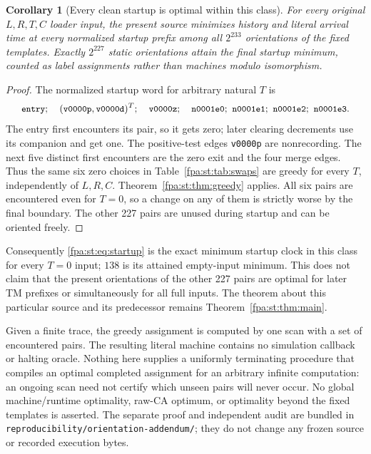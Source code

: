 \documentclass[11pt,a4paper]{article}
\numberwithin{equation}{section}
\newtheorem{corollary}[theorem]{Corollary}
\newcommand{\code}[1]{\texttt{\small #1}}
\begin{document}
\begin{corollary}[Every clean startup is optimal within this class]
\label{fpa:st:cor:optimalstartup}
For every original $L,R,T,C$ loader input, the present source minimizes
history and literal arrival time at every normalized startup prefix among
all $2^{233}$ orientations of the fixed templates. Exactly $2^{227}$ static
orientations attain the final startup minimum, counted as label assignments
rather than machines modulo isomorphism.
\end{corollary}
\begin{proof}
The normalized startup word for arbitrary natural $T$ is
\[
 \code{entry};\quad
 (\code{v0000p},\code{v0000d})^T;\quad
 \code{v0000z};\quad
 \code{n0001e0};\ \code{n0001e1};\ \code{n0001e2};\ \code{n0001e3}.
\]
The entry first encounters its pair, so it gets zero; later clearing
decrements use its companion and get one. The positive-test edges
\code{v0000p} are nonrecording. The next five distinct first encounters are
the zero exit and the four merge edges. Thus the same six zero choices in
Table~\ref{fpa:st:tab:swaps} are greedy for every $T$, independently of $L,R,C$.
Theorem~\ref{fpa:st:thm:greedy} applies. All six pairs are encountered even for
$T=0$, so a change on any of them is strictly worse by the final boundary.
The other 227 pairs are unused during startup and can be oriented freely.
\end{proof}

Consequently \eqref{fpa:st:eq:startup} is the exact minimum startup clock in this
class for every $T=0$ input; $138$ is its attained empty-input minimum.
This does not claim that the present orientations of the other 227 pairs
are optimal for later TM prefixes or simultaneously for all full inputs.
The theorem about this particular source and its predecessor remains
Theorem~\ref{fpa:st:thm:main}.

Given a finite trace, the greedy assignment is computed by one scan with a
set of encountered pairs. The resulting literal machine contains no
simulation callback or halting oracle. Nothing here supplies a uniformly
terminating procedure that compiles an optimal completed assignment for an
arbitrary infinite computation: an ongoing scan need not certify which
unseen pairs will never occur. No global machine/runtime optimality,
raw-CA optimum, or optimality beyond the fixed templates is asserted.
The separate proof and independent audit are bundled in
\code{reproducibility/orientation-addendum/}; they do not change any frozen
source or recorded execution bytes.
\end{document}

